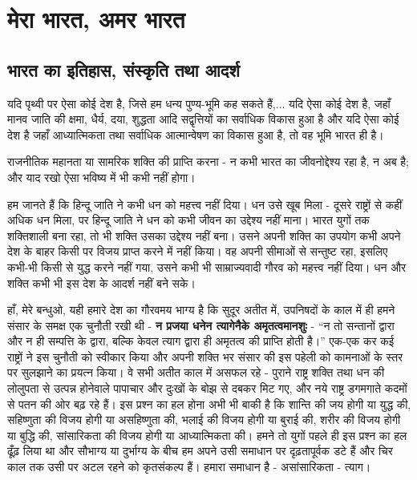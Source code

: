 
\chapter{मेरा भारत, अमर भारत }

\indentsecionsintoc



\section*{भारत का इतिहास, संस्कृति तथा आदर्श}


यदि पृथ्वी पर ऐसा कोई देश है, जिसे हम धन्य पुण्य-भूमि कह सकते हैं,... यदि ऐसा कोई देश है, जहाँ मानव जाति की क्षमा, धैर्य, दया, शुद्धता आदि सद्वृत्तियों का सर्वाधिक विकास हुआ है और यदि ऐसा कोई देश है जहाँ आध्यात्मिकता तथा सर्वाधिक आत्मान्वेषण का विकास हुआ है, तो वह भूमि भारत ही है। 

राजनीतिक महानता या सामरिक शक्ति की प्राप्ति करना - न कभी भारत का जीवनोद्देश्य रहा है, न अब है; और याद रखो ऐसा भविष्य में भी कभी नहीं होगा। 

हम जानते हैं कि हिन्दू जाति ने कभी धन को महत्त्व नहीं दिया। धन उसे खूब मिला - दूसरे राष्ट्रों से कहीं अधिक धन मिला, पर हिन्दू जाति ने धन को कभी जीवन का उद्देश्य नहीं माना। भारत युगों तक शक्तिशाली बना रहा, तो भी शक्ति उसका उद्देश्य नहीं बना। उसने अपनी शक्ति का उपयोग कभी अपने देश के बाहर किसी पर विजय प्राप्त करने में नहीं किया। वह अपनी सीमाओं से सन्तुष्ट रहा, इसलिए कभी-भी किसी से युद्ध करने नहीं गया, उसने कभी भी साम्राज्यवादी गौरव को महत्त्व नहीं दिया। धन और शक्ति कभी भी इस देश के आदर्श नहीं बने सके। 

हाँ, मेरे बन्धुओ, यही हमारे देश का गौरवमय भाग्य है कि सुदूर अतीत में, उपनिषदों के काल में ही हमने संसार के समक्ष एक चुनौती रखी थी - \textbf{न प्रजया धनेन त्यागेनैके अमृतत्वमानशुः } - “न तो सन्तानों द्वारा और न ही सम्पत्ति के द्वारा, बल्कि केवल त्याग द्वारा ही अमृतत्व की प्राप्ति होती है।” एक-एक कर कई राष्ट्रों ने इस चुनौती को स्वीकार किया और अपनी शक्ति भर संसार की इस पहेली को कामनाओं के स्तर पर सुलझाने का प्रयत्न किया। वे सभी अतीत काल में असफल रहे - पुराने राष्ट्र शक्ति तथा धन की लोलुपता से उत्पन्न होनेवाले पापाचार और दुःखों के बोझ से दबकर मिट गए, और नये राष्ट्र डगमगाते कदमों से पतन की ओर बढ़ रहे हैं। इस प्रश्न का हल होना अभी भी बाकी है कि शान्ति की जय होगी या युद्ध की, सहिष्णुता की विजय होगी या असहिष्णुता की, भलाई की विजय होगी या बुराई की, शरीर की विजय होगी या बुद्धि की, सांसारिकता की विजय होगी या आध्यात्मिकता की। हमने तो युगों पहले ही इस प्रश्न का हल ढूँढ़ लिया था और सौभाग्य या दुर्भाग्य के बीच हम अपने उसी समाधान पर दृढ़तापूर्वक डटे हैं और चिर काल तक उसी पर अटल रहने को कृतसंकल्प हैं। हमारा समाधान है - असांसारिकता - त्याग। 

